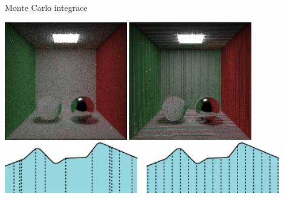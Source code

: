 \documentclass[czech]{beamer}
\begin{document}
\begin{frame}{Monte Carlo integrace}

\centering \includegraphics[width=0.4\textwidth]{img/MC sampling.png}
\centering \includegraphics[width=0.4\textwidth]{img/discrete sampling.png}
\\
\centering \includegraphics[width=0.9\textwidth]{img/monte carlo.png}
\end{frame}
\end{document}
